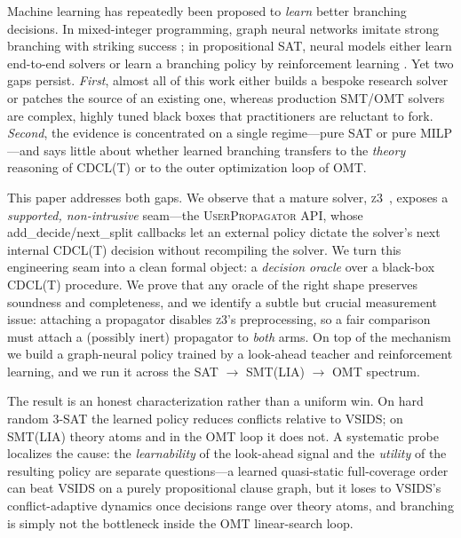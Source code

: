 \documentclass[letterpaper]{article} %
\theoremstyle{definition}
\theoremstyle{plain}
\theoremstyle{remark}
\newcommand{\solver}{\textsc{z3}}
\newcommand{\decide}{\textsf{add\_decide}}
\newcommand{\nextsplit}{\textsf{next\_split}}
\begin{document}
Machine learning has repeatedly been proposed to \emph{learn} better
branching decisions. In mixed-integer programming, graph neural networks
imitate strong branching with striking success
\citep{gasse2019exact,nair2020solving}; in propositional SAT, neural models
either learn end-to-end solvers \citep{selsam2019neurosat} or learn a
branching policy by reinforcement learning \citep{kurin2020graphqsat}. Yet
two gaps persist. \emph{First}, almost all of this work either builds a
bespoke research solver or patches the source of an existing one, whereas
production SMT/OMT solvers are complex, highly tuned black boxes that
practitioners are reluctant to fork. \emph{Second}, the evidence is
concentrated on a single regime---pure SAT or pure MILP---and says little
about whether learned branching transfers to the \emph{theory} reasoning of
\textsc{CDCL(T)} or to the outer optimization loop of OMT.

This paper addresses both gaps. We observe that a mature solver,
\solver{}~\citep{demoura2008z3}, exposes a \emph{supported, non-intrusive}
seam---the \textsc{UserPropagator} API, whose \decide{}/\nextsplit{}
callbacks let an external policy dictate the solver's next internal
\textsc{CDCL(T)} decision without recompiling the solver. We turn this
engineering seam into a clean formal object: a \emph{decision oracle} over a
black-box \textsc{CDCL(T)} procedure. We prove that any oracle of the right
shape preserves soundness and completeness, and we identify a subtle but
crucial measurement issue: attaching a propagator disables \solver{}'s
preprocessing, so a fair comparison must attach a (possibly inert)
propagator to \emph{both} arms. On top of the mechanism we build a
graph-neural policy trained by a look-ahead teacher and reinforcement
learning, and we run it across the SAT $\to$ SMT(LIA) $\to$ OMT spectrum.

The result is an honest characterization rather than a uniform win. On hard
random 3-SAT the learned policy reduces conflicts relative to VSIDS; on
SMT(LIA) theory atoms and in the OMT loop it does not. A systematic probe
localizes the cause: the \emph{learnability} of the look-ahead signal and
the \emph{utility} of the resulting policy are separate questions---a
learned quasi-static full-coverage order can beat VSIDS on a purely
propositional clause graph, but it loses to VSIDS's conflict-adaptive
dynamics once decisions range over theory atoms, and branching is simply not
the bottleneck inside the OMT linear-search loop.
\end{document}
